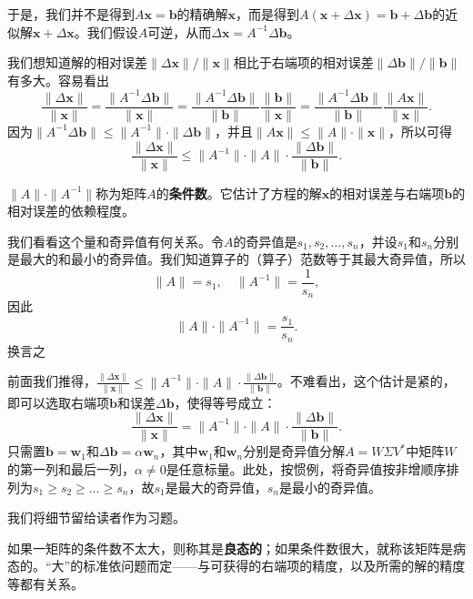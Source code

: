 于是，我们并不是得到$A\mathbf{x}=\mathbf{b}$的精确解$\mathbf{x}$，而是得到$A(\mathbf{x}+\Delta\mathbf{x})=\mathbf{b}+\Delta\mathbf{b}$的近似解$\mathbf{x}+\Delta\mathbf{x}$。我们假设$A$可逆，从而$\Delta\mathbf{x}=A^{-1}\Delta\mathbf{b}$。

我们想知道解的相对误差$\|\Delta\mathbf{x}\|/\|\mathbf{x}\|$相比于右端项的相对误差$\|\Delta\mathbf{b}\|/\|\mathbf{b}\|$有多大。容易看出
\[\frac{\|\Delta\mathbf{x}\|}{\|\mathbf{x}\|}=\frac{\|A^{-1}\Delta\mathbf{b}\|}{\|\mathbf{x}\|}=\frac{\|A^{-1}\Delta\mathbf{b}\|}{\|\mathbf{b}\|}\frac{\|\mathbf{b}\|}{\|\mathbf{x}\|}=\frac{\|A^{-1}\Delta\mathbf{b}\|}{\|\mathbf{b}\|}\frac{\|A\mathbf{x}\|}{\|\mathbf{x}\|}.\]
因为$\|A^{-1}\Delta\mathbf{b}\|\le \|A^{-1}\|\cdot \|\Delta\mathbf{b}\|$，并且$\|A\mathbf{x}\|\le\|A\|\cdot \|\mathbf{x}\|$，所以可得
\[\frac{\|\Delta\mathbf{x}\|}{\|\mathbf{x}\|}\leq\|A^{-1}\|\cdot\|A\|\cdot\frac{\|\Delta\mathbf{b}\|}{\|\mathbf{b}\|}.\]

$\|A\|\cdot\|A^{-1}\|$称为矩阵$A$的{\bf 条件数}。它估计了方程的解$\mathbf{x}$的相对误差与右端项$\mathbf{b}$的相对误差的依赖程度。

我们看看这个量和奇异值有何关系。令$A$的奇异值是$s_{1},s_{2},\ldots,s_{n}$，并设$s_1$和$s_n$分别是最大的和最小的奇异值。我们知道算子的（算子）范数等于其最大奇异值，所以
\[\|A\|=s_1,\quad\|A^{-1}\|=\frac{1}{s_n},\]
因此\[\|A\|\cdot\|A^{-1}\|=\frac{s_1}{s_n}.\]
换言之
\begin{center}
\end{center}

前面我们推得，$\frac{\|\Delta\mathbf{x}\|}{\|\mathbf{x}\|}\leq\|A^{-1}\|\cdot\|A\|\cdot\frac{\|\Delta\mathbf{b}\|}{\|\mathbf{b}\|}$。不难看出，这个估计是紧的，即可以选取右端项$\mathbf{b}$和误差$\Delta\mathbf{b}$，使得等号成立：
\[\frac{\|\Delta\mathbf{x}\|}{\|\mathbf{x}\|}=\|A^{-1}\|\cdot\|A\|\cdot\frac{\|\Delta\mathbf{b}\|}{\|\mathbf{b}\|}.\]
只需置$\mathbf{b}=\mathbf{w}_{1}$和$\Delta\mathbf{b}=\alpha\mathbf{w}_{n}$，其中$\mathbf{w}_{1}$和$\mathbf{w}_{n}$分别是奇异值分解$A=W\Sigma V^*$中矩阵$W$的第一列和最后一列，$\alpha\neq 0$是任意标量。此处，按惯例，将奇异值按非增顺序排列为$s_{1}\geq s_{2}\geq\ldots\geq s_{n}$，故$s_1$是最大的奇异值，$s_n$是最小的奇异值。

我们将细节留给读者作为习题。

如果一矩阵的条件数不太大，则称其是{\bf 良态的}；如果条件数很大，就称该矩阵是病态的。“大”的标准依问题而定——与可获得的右端项的精度，以及所需的解的精度等都有关系。

